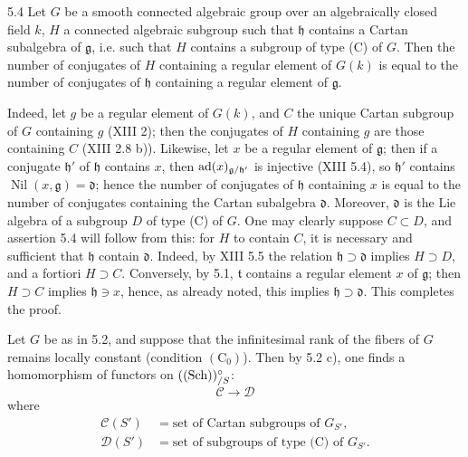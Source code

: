 \begin{corollary}{5.4}\label{XIV.5.4}
Let $G$ be a
smooth connected
algebraic group
over an
algebraically
closed field $k$,
$H$ a connected
algebraic subgroup
such that
$\mathfrak h$
contains a Cartan
subalgebra of
$\mathfrak g$,
i.e. such that
$H$ contains a
subgroup of type
(C) of $G$.
Then the number
of conjugates
of $H$ containing
a regular element
of $G(k)$ is
equal to the
number of conjugates
of $\mathfrak h$
containing a regular
element of
$\mathfrak g$.
\end{corollary}
Indeed, let $g$
be a regular
element of $G(k)$,
and $C$ the
unique Cartan
subgroup of $G$
containing $g$
(XIII 2); then
the conjugates
of $H$ containing
$g$ are those
containing $C$
(XIII 2.8 b)).
Likewise, let
$x$ be a regular
element of
$\mathfrak g$;
then if a
conjugate
$\mathfrak h'$
of $\mathfrak h$
contains $x$,
then
$\operatorname{ad}(x)_{\mathfrak g/\mathfrak h'}$
is injective
(XIII 5.4), so
$\mathfrak h'$
contains
$\operatorname{Nil}(x,\mathfrak g)=\mathfrak d$;
hence the number
of conjugates
of $\mathfrak h$
containing $x$
is equal to the
number of conjugates
containing the
Cartan subalgebra
$\mathfrak d$.
Moreover,
$\mathfrak d$ is
the Lie algebra
of a subgroup
$D$ of type (C)
of $G$.
One may clearly
suppose $C\subset D$,
and assertion
5.4 will follow
from this:
for $H$ to
contain $C$,
it is necessary
and sufficient
that $\mathfrak h$
contain
$\mathfrak d$.
Indeed, by XIII
5.5 the relation
$\mathfrak h\supset\mathfrak d$
implies
$H\supset D$,
and a fortiori
$H\supset C$.
Conversely, by
5.1,
$\mathfrak t$
contains a regular
element $x$ of
$\mathfrak g$;
then $H\supset C$
implies
$\mathfrak h\ni x$,
hence, as already
noted, this implies
$\mathfrak h\supset\mathfrak d$.
This completes
the proof.

Let $G$ be
as in 5.2,
and suppose
that the
infinitesimal
rank of the
fibers of $G$
remains locally
constant
(condition
$(\mathrm C_0)$).
Then by 5.2 c),
one finds a
homomorphism of
functors on
$(\textup{(Sch)})^\circ_{/S}$:
\[
 \mathscr C\longrightarrow\mathscr D
\]
where
\[
\begin{aligned}
 \mathscr C(S')&=\text{set of Cartan subgroups of }G_{S'},\\
 \mathscr D(S')&=\text{set of subgroups of type (C) of }G_{S'}.
\end{aligned}
\]
